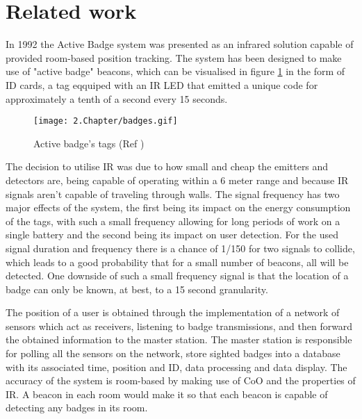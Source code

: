 \section{Related work}
\label{sec:related}



\label{subsec:badge}


In 1992 the Active Badge system \cite{badge} was presented as an infrared solution capable of provided room-based position tracking. The system has been designed to make use of "active badge" beacons, which can be visualised in figure \ref{fig:badge} in the form of ID cards, a tag eqquiped with an \ac{IR} LED that emitted a unique code for approximately a tenth of a second every 15 seconds.

\begin{figure}[H]
	\centering
		\texttt{[image: 2.Chapter/badges.gif]}
	\caption[Active badge's tags (Ref \cite{badgefig}) ]{Active badge's tags (Ref \cite{badgefig}) }
	\label{fig:badge}
\end{figure}

The decision to utilise \ac{IR} was due to how small and cheap the emitters and detectors are, being capable of operating within a 6 meter range and because \ac{IR} signals aren’t capable of traveling through walls. The signal frequency has two major effects of the system, the first being its impact on the energy consumption of the tags, with such a small frequency allowing for long periods of work on a single battery and the second being its impact on user detection. For the used signal duration and frequency there is a chance of 1/150 for two signals to collide, which leads to a good probability that for a small number of beacons, all will be detected. One downside of such a small frequency signal is that the location of a badge can only be known, at best, to a 15 second granularity.

The position of a user is obtained through the implementation of a network of sensors which act as receivers, listening to badge transmissions, and then forward the obtained information to the master station. The master station is responsible for polling all the sensors on the network, store sighted badges into a database with its associated time, position and ID, data processing and data display. The accuracy of the system is room-based by making use of \ac{CoO} and the properties of \ac{IR}. A beacon in each room would make it so that each beacon is capable of detecting any badges in its room.

